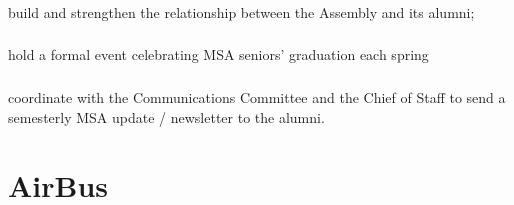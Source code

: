 \subsubsection{}
build and strengthen the relationship between the Assembly and its alumni;
\subsubsection{}
hold a formal event celebrating MSA seniors' graduation each spring
\subsubsection{}
coordinate with the Communications Committee and the Chief of Staff to send  a semesterly MSA update / newsletter to the alumni.


\section{AirBus}